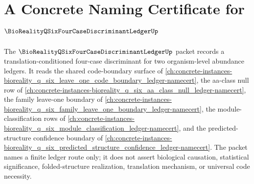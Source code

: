 \chapter{A Concrete Naming Certificate for $\BioRealityQSixFourCaseDiscriminantLedgerUp$}
\label{ch:concrete-instances-bioreality-q-six-four-case-discriminant-ledger-namecert}

The $\BioRealityQSixFourCaseDiscriminantLedgerUp$ packet records a translation-conditioned four-case discriminant for two organism-level abundance ledgers. It reads the shared code-boundary surface of \autoref{ch:concrete-instances-bioreality_q_six_leave_one_code_boundary_ledger-namecert}, the aa-class null row of \autoref{ch:concrete-instances-bioreality_q_six_aa_class_null_ledger-namecert}, the family leave-one boundary of \autoref{ch:concrete-instances-bioreality_q_six_family_leave_one_boundary_ledger-namecert}, the module-classification rows of \autoref{ch:concrete-instances-bioreality_q_six_module_classification_ledger-namecert}, and the predicted-structure confidence boundary of \autoref{ch:concrete-instances-bioreality_q_six_predicted_structure_confidence_ledger-namecert}. The packet names a finite ledger route only; it does not assert biological causation, statistical significance, folded-structure realization, translation mechanism, or universal code necessity.

